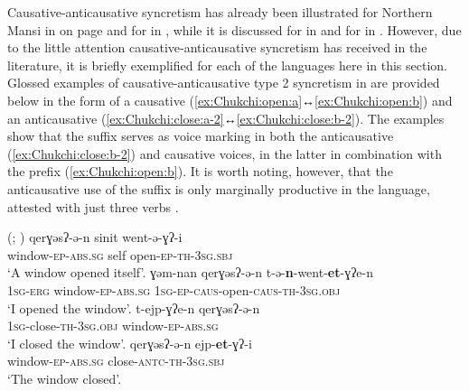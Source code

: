 Causative-anticausative syncretism has already been illustrated for Northern Mansi in  on page \pageref{tab:ch3:type1a-examples-2} and for  in , while it is discussed for  in  and for  in . However, due to the little attention causative-anticausative syncretism has received in the literature, it is briefly exemplified for each of the languages here in this section. Glossed examples of causative-anticausative type 2 syncretism in  are provided below in the form of a causative  (\ref{ex:Chukchi:open:a}↔\ref{ex:Chukchi:open:b}) and an anticausative  (\ref{ex:Chukchi:close:a-2}↔\ref{ex:Chukchi:close:b-2}). The examples show that the suffix  serves as voice marking in both the anticausative (\ref{ex:Chukchi:close:b-2}) and causative voices, in the latter in combination with the prefix  (\ref{ex:Chukchi:open:b}). It is worth noting, however, that the anticausative use of the suffix is only marginally productive in the language, attested with just three verbs \citep[187]{kurebito:2012}.

\ea {} (\citealt[6]{stenin:2017}; \citealt[187]{kurebito:2012})
\ea\label{ex:Chukchi:open:a}
	\gll	qerɣəsʔ-ə-n sinit went-ə-ɣʔ-i \\
			window-\textsc{ep-abs.sg} self open-\textsc{ep-th-3sg.sbj} \\
	\glt	‘A window opened itself’.
\ex\label{ex:Chukchi:open:b}
	\gll	ɣəm-nan qerɣəsʔ-ə-n t-ə-\textbf{n}-went-\textbf{et}-ɣʔe-n \\
			\textsc{1sg-erg} window-\textsc{ep-abs.sg} \textsc{1sg-ep-caus}-open-\textsc{caus-th-3sg.obj} \\
	\glt	‘I opened the window’.
\ex\label{ex:Chukchi:close:a-2}
	\gll	t-ejp-ɣʔe-n qerɣəsʔ-ə-n \\
			\textsc{1sg}-close-\textsc{th-3sg.obj} window-\textsc{ep-abs.sg} \\
	\glt	‘I closed the window’.
\ex\label{ex:Chukchi:close:b-2}
	\gll	qerɣəsʔ-ə-n ejp-\textbf{et}-ɣʔ-i \\
			window-\textsc{ep-abs.sg} close-\textsc{antc-th-3sg.sbj} \\
	\glt	‘The window closed’.
	\z 
\z

